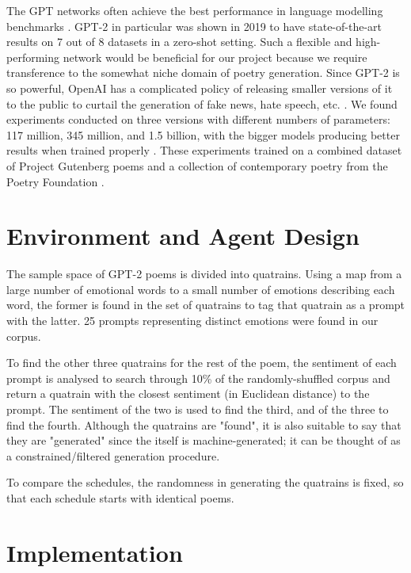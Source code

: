 \documentclass[a4paper,10pt]{article}
\begin{document}
The GPT networks often achieve the best performance in language modelling benchmarks \cite{language_modelling_benchmarks}. GPT-2 in particular was shown in 2019 to have state-of-the-art results on 7 out of 8 datasets in a zero-shot setting. Such a flexible and high-performing network would be beneficial for our project because we require transference to the somewhat niche domain of poetry generation. Since GPT-2 is so powerful, OpenAI has a complicated policy of releasing smaller versions of it to the public to curtail the generation of fake news, hate speech, etc. \cite{solaiman_release_2019}. We found experiments conducted on three versions with different numbers of parameters: 117 million, 345 million, and 1.5 billion, with the bigger models producing better results when trained properly \cite{branwen_gpt-2_2019}. These experiments trained on a combined dataset of Project Gutenberg poems and a collection of contemporary poetry from the Poetry Foundation \cite{foundation_poems_2021}.

\section{Environment and Agent Design}

The sample space of GPT-2 poems is divided into quatrains. Using a map from a large number of emotional words to a small number of emotions describing each word, the former is found in the set of quatrains to tag that quatrain as a prompt with the latter. 25 prompts representing distinct emotions were found in our corpus.

To find the other three quatrains for the rest of the poem, the sentiment of each prompt is analysed to search through 10\% of the randomly-shuffled corpus and return a quatrain with the closest sentiment (in Euclidean distance) to the prompt. The sentiment of the two is used to find the third, and of the three to find the fourth. Although the quatrains are "found", it is also suitable to say that they are "generated" since the itself is machine-generated; it can be thought of as a constrained/filtered generation procedure.

To compare the schedules, the randomness in generating the quatrains is fixed, so that each schedule starts with identical poems.

\section{Implementation}
\label{sec:implementation}
\end{document}
